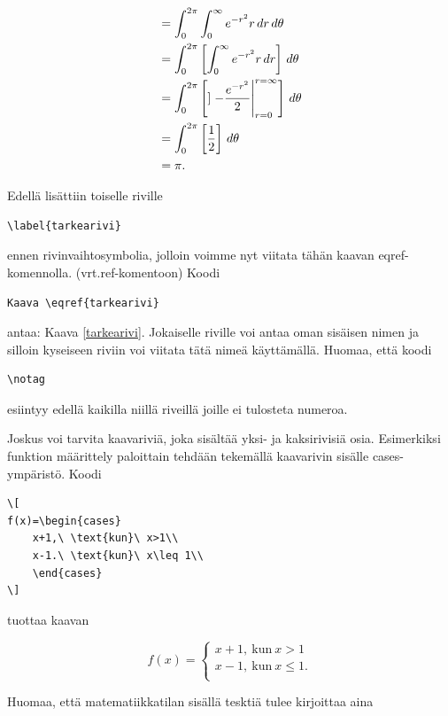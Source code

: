 \documentclass[a4paper,12 pt]{article}
\theoremstyle{plain}
\theoremstyle{definition}
\theoremstyle{remark}
\numberwithin{equation}{section}
\numberwithin{figure}{section}
\begin{document}
\begin{align}
&=\int_0^{2\pi} \int_0^\infty
  e^{-r^2} r\,dr\,d\theta\notag
\\
&=\int_0^{2\pi}\left[ \int_0^\infty
  e^{-r^2}r\,dr\right] \,d\theta\label{tarkearivi}
\\
&=\int_0^{2\pi} \left[] \left. -\frac{e^{-r^2}}2
  \right|_{r=0}^{r=\infty} \right] \,d\theta\notag
\\
&=\int_0^{2\pi} \left[\frac12\right]\,d\theta\notag
\\
&=\pi\notag.
\end{align}

Edellä lisättiin toiselle riville 

\begin{verbatim}
\label{tarkearivi}
\end{verbatim}
ennen rivinvaihtosymbolia, jolloin voimme nyt viitata tähän kaavan  eqref-komennolla. (vrt.ref-komentoon) Koodi

\begin{verbatim}
Kaava \eqref{tarkearivi}
\end{verbatim}
antaa: Kaava \eqref{tarkearivi}. Jokaiselle riville voi antaa oman sisäisen nimen ja silloin kyseiseen riviin voi viitata tätä nimeä käyttämällä. Huomaa, että koodi

\begin{verbatim}
\notag
\end{verbatim}
esiintyy edellä kaikilla niillä riveillä joille ei tulosteta numeroa.

Joskus voi tarvita kaavariviä, joka sisältää yksi- ja kaksirivisiä osia. Esimerkiksi funktion määrittely paloittain tehdään tekemällä kaavarivin sisälle cases-ympäristö. Koodi 

\begin{verbatim}
\[
f(x)=\begin{cases}
    x+1,\ \text{kun}\ x>1\\
    x-1.\ \text{kun}\ x\leq 1\\
    \end{cases}
\]
\end{verbatim}
tuottaa kaavan

\[
f(x)=\begin{cases}
    x+1,\ \text{kun}\ x>1\\
    x-1,\ \text{kun}\ x\leq 1.\\
    \end{cases}
\]

\noindent Huomaa, että matematiikkatilan sisällä tesktiä tulee kirjoittaa aina 
\end{document}
